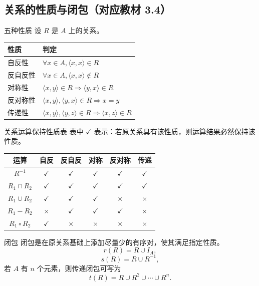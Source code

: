\documentclass[UTF8,zihao=-4]{ctexart}
\begin{document}
\subsection{关系的性质与闭包（对应教材 3.4）}

\begin{corebox}{五种性质}
设 $R$ 是 $A$ 上的关系。
\begin{center}
\begin{tabularx}{\textwidth}{p{2.5cm}X}
\toprule
性质 & 判定 \\
\midrule
自反性 & $\forall x\in A,\langle x,x\rangle\in R$ \\
反自反性 & $\forall x\in A,\langle x,x\rangle\notin R$ \\
对称性 & $\langle x,y\rangle\in R\Rightarrow\langle y,x\rangle\in R$ \\
反对称性 & $\langle x,y\rangle,\langle y,x\rangle\in R\Rightarrow x=y$ \\
传递性 & $\langle x,y\rangle,\langle y,z\rangle\in R\Rightarrow\langle x,z\rangle\in R$ \\
\bottomrule
\end{tabularx}
\end{center}
\end{corebox}

\begin{corebox}{关系运算保持性质表}
表中 $\checkmark$ 表示：若原关系具有该性质，则运算结果必然保持该性质。
\begin{center}
\begin{tabular}{c|ccccc}
\toprule
运算 & 自反 & 反自反 & 对称 & 反对称 & 传递 \\
\midrule
$R^{-1}$ & $\checkmark$ & $\checkmark$ & $\checkmark$ & $\checkmark$ & $\checkmark$ \\
$R_1\cap R_2$ & $\checkmark$ & $\checkmark$ & $\checkmark$ & $\checkmark$ & $\checkmark$ \\
$R_1\cup R_2$ & $\checkmark$ & $\checkmark$ & $\checkmark$ & $\times$ & $\times$ \\
$R_1-R_2$ & $\times$ & $\checkmark$ & $\checkmark$ & $\checkmark$ & $\times$ \\
$R_1\circ R_2$ & $\checkmark$ & $\times$ & $\times$ & $\times$ & $\times$ \\
\bottomrule
\end{tabular}
\end{center}
\end{corebox}

\begin{corebox}{闭包}
闭包是在原关系基础上添加尽量少的有序对，使其满足指定性质。
\[
r(R)=R\cup I_A,
\]
\[
s(R)=R\cup R^{-1},
\]
若 $A$ 有 $n$ 个元素，则传递闭包可写为
\[
t(R)=R\cup R^2\cup\cdots\cup R^n.
\]
\end{corebox}
\end{document}
